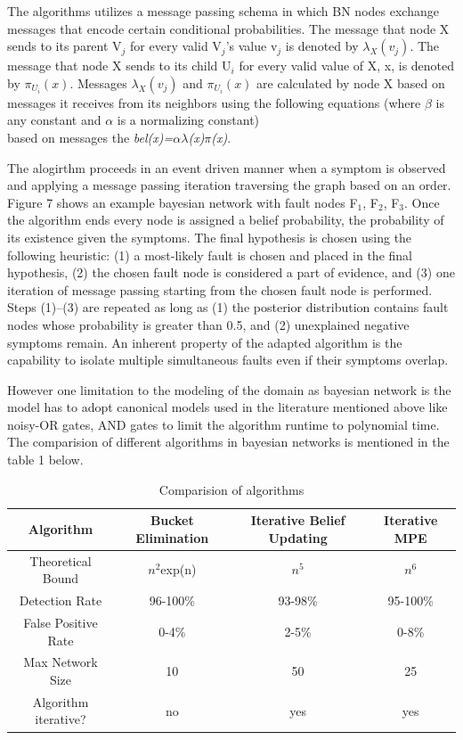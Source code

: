 \documentclass[10pt]{sigplan-proc-varsize}
\begin{document}
The algorithms  utilizes a message passing schema in which BN nodes exchange messages that encode certain conditional probabilities. The message that node X sends to its parent V$_j$ for every valid V$_j$'s value v$_j$ is denoted by ${\lambda}_X(v_j)$. The message that node X sends to its child U$_i$ for every valid value of X, x, is denoted by ${\pi}_{U_i}(x)$. Messages ${\lambda}_X(v_j)$ and ${\pi}_{U_i}(x)$ are calculated by node X based on messages it receives from its neighbors using the following equations (where $\beta$ is any constant and $\alpha$ is a normalizing constant)
\\
based on messages the {\it bel(x)={$\alpha$}{$\lambda$}(x){$\pi$}(x)}.

The alogirthm proceeds in an event driven manner when a symptom is observed and applying a message passing iteration traversing the graph based on an order. Figure 7 shows an example bayesian network with fault nodes F$_1$, F$_2$, F$_3$. Once the algorithm ends every node is assigned a belief probability, the probability of its existence given the symptoms. The final hypothesis is chosen using the following heuristic: (1) a most-likely fault is chosen and placed in the final hypothesis, (2) the chosen fault node is considered a part of evidence, and (3) one iteration of message passing starting from the chosen fault node is performed. Steps (1)–(3) are repeated as long as (1) the posterior distribution contains fault nodes whose probability is greater than 0.5, and (2) unexplained negative symptoms remain. An inherent property of the adapted algorithm is the capability to isolate multiple simultaneous faults even if their symptoms overlap. 

However one limitation to the modeling of the domain as bayesian network is the model has to adopt canonical models used in the literature mentioned above like noisy-OR gates, AND gates to limit the algorithm runtime to polynomial time. The comparision of different algorithms in bayesian networks is mentioned in the table 1 below.

\begin{center}
\begin{table}[ht]
{\small
\hfill{}
    \begin{tabular}{ | c | c | c | c |}
    \hline
    Algorithm & Bucket Elimination & Iterative Belief Updating & Iterative MPE \\ \hline
    Theoretical Bound & $n^2$exp(n) & $n^5$ & $n^6$ \\ \hline
    Detection Rate & 96-100\% & 93-98\% & 95-100\% \\ \hline
    False Positive Rate & 0-4\% & 2-5\% & 0-8\% \\ \hline
    Max Network Size & 10 & 50 & 25 \\ \hline
    Algorithm iterative? & no & yes & yes \\
    \hline
    \end{tabular}}
\hfill{}
\caption{Comparision of algorithms}
\label{tb:tablename}
\end{table}
\end{center}
\end{document}
